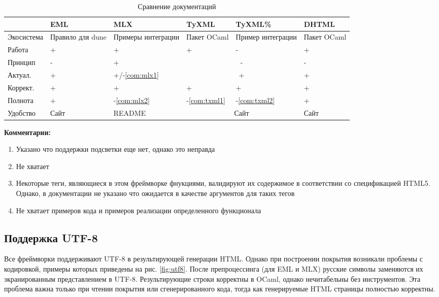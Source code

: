 \begin{table}[h!]
\begin{tabularx}{\textwidth}{
    lXXXXX}
    \toprule
 & EML & MLX & TyXML & TyXML\% & DHTML \\
 \midrule
Экосистема & Правило для dune & Примеры интеграции & Пакет OCaml & Пример интеграции & Пакет OCaml \\
Работа & + & + & + & - & + \\
Принцип & - & + & \multicolumn{2}{|c|}{-} & - \\
Актуал. & + & +/-\ref{com:mlx1} & \multicolumn{2}{|c|}{+} & + \\
Коррект. & + & + & + & + & + \\
Полнота & + & -\ref{com:mlx2} & -\ref{com:txml1} & -\ref{com:txml2} & + \\
Удобство & Сайт & README & \multicolumn{2}{|c|}{Сайт} & Сайт \\
\bottomrule
\end{tabularx}
\caption{Сравнение документаций}
\label{tab:docs}
\end{table}

\begin{minipage}{.8\linewidth}
\footnotesize
\textbf{Комментарии:}
\begin{enumerate}
    \item \label{com:mlx1} Указано что поддержки подсветки еще нет, однако это неправда
    \item \label{com:mlx2} Не хватает 
    \item \label{com:txml1} Некоторые теги, являющиеся в этом фреймворке фнукциями, валидируют их содержимое в соответствии со спецификацией HTML5. Однако, в документации не указано что ожидается в качестве аргументов для таких тегов
    \item \label{com:txml2} Не хватает примеров кода и примеров реализации определенного функционала
\end{enumerate}
\end{minipage}

\subsection{Поддержка UTF-8}

Все фреймворки поддерживают UTF-8 в результирующей генерации HTML.
Однако при построении покрытия возникали проблемы с кодировкой, примеры которых приведены на рис. \ref{fig:utf8}.
После препроцессинга (для EML и MLX) русские символы заменяются их экранированным представлением в UTF-8.
Результирующие строки корректны в OCaml, однако нечитабельны без инструментов.
Эта проблема важна только при чтении покрытия или сгенерированного кода, тогда как генерируемые HTML страницы полностью корректны.

